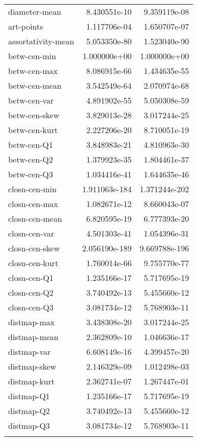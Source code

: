 \begin{longtable}{lrr}
	diameter-mean                 &   8.430551e-10 &   9.359119e-08 \\
	art-points                    &   1.117706e-04 &   1.650707e-07 \\
	assortativity-mean            &   5.053350e-80 &   1.523040e-90 \\
	betw-cen-min                  &   1.000000e+00 &   1.000000e+00 \\
	betw-cen-max                  &   8.086915e-66 &   1.434635e-55 \\
	betw-cen-mean                 &   3.542549e-64 &   2.070974e-68 \\
	betw-cen-var                  &   4.891902e-55 &   5.050308e-59 \\
	betw-cen-skew                 &   3.829013e-28 &   3.017244e-25 \\
	betw-cen-kurt                 &   2.227206e-20 &   8.710051e-19 \\
	betw-cen-Q1                   &   3.848983e-21 &   4.810963e-30 \\
	betw-cen-Q2                   &   1.379923e-35 &   1.804461e-37 \\
	betw-cen-Q3                   &   1.034416e-41 &   1.644635e-46 \\
	closn-cen-min                 &  1.911063e-184 &  1.371244e-202 \\
	closn-cen-max                 &   1.082671e-12 &   8.660043e-07 \\
	closn-cen-mean                &   6.820595e-19 &   6.777393e-20 \\
	closn-cen-var                 &   4.501303e-41 &   1.054396e-31 \\
	closn-cen-skew                &  2.056190e-189 &  9.669788e-196 \\
	closn-cen-kurt                &   1.760014e-66 &   9.755770e-77 \\
	closn-cen-Q1                  &   1.235166e-17 &   5.717695e-19 \\
	closn-cen-Q2                  &   3.740492e-13 &   5.455660e-12 \\
	closn-cen-Q3                  &   3.081734e-12 &   5.768903e-11 \\
	distmap-max                   &   3.438308e-20 &   3.017244e-25 \\
	distmap-mean                  &   2.362809e-10 &   1.046636e-17 \\
	distmap-var                   &   6.608149e-16 &   4.399457e-20 \\
	distmap-skew                  &   2.146329e-09 &   1.012498e-03 \\
	distmap-kurt                  &   2.362741e-07 &   1.267447e-01 \\
	distmap-Q1                    &   1.235166e-17 &   5.717695e-19 \\
	distmap-Q2                    &   3.740492e-13 &   5.455660e-12 \\
	distmap-Q3                    &   3.081734e-12 &   5.768903e-11 \\
	\label{tab:results-pvalues}
\end{longtable}


